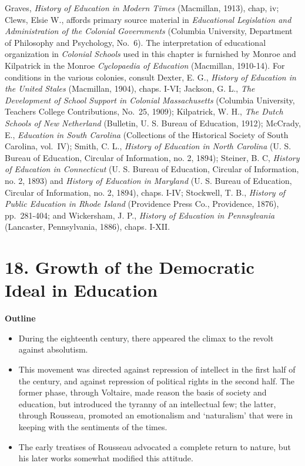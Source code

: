 \documentclass[
]{book}
\providecommand{\tightlist}{%
  \setlength{\itemsep}{0pt}\setlength{\parskip}{0pt}}
\begin{document}
Graves, \emph{History of Education in Modern Times} (Macmillan, 1913), chap, iv; Clews, Elsie W., affords primary source material in \emph{Educational Legislation and Administration of the Colonial Governments} (Columbia University, Department of Philosophy and Psychology, No.~6). The interpretation of educational organization in \emph{Colonial Schools} used in this chapter is furnished by Monroe and Kilpatrick in the Monroe \emph{Cyclopaedia of Education} (Macmillan, 1910-14). For conditions in the various colonies, consult Dexter, E. G., \emph{History of Education in the United Stales} (Macmillan, 1904), chaps. I-VI; Jackson, G. L., \emph{The Development of School Support in Colonial Massachusetts} (Columbia University, Teachers College Contributions, No.~25, 1909); Kilpatrick, W. H., \emph{The Dutch Schools of New Netherland} (Bulletin, U. S. Bureau of Education, 1912); McCrady, E., \emph{Education in South Carolina} (Collections of the Historical Society of South Carolina, vol.~IV); Smith,\protect\hypertarget{ch17.xmlux5cux23para.257.1.0.box.257.234.1051.404.q.50}{}{ C. L., \emph{History of Education in North Carolina} (U. S. Bureau of Education, Circular of Information, no. 2, 1894); Steiner, B. C, \emph{History of Education in Connecticut} (U. S. Bureau of Education, Circular of Information, no. 2, 1893) and \emph{History of Education in Maryland} (U. S. Bureau of Education, Circular of Information, no. 2, 1894), chaps. I-IV; Stockwell, T. B., \emph{History of Public Education in Rhode Island} (Providence Press Co., Providence, 1876), pp.~281-404; and Wickersham, J. P., \emph{History of Education in Pennsylvania} (Lancaster, Pennsylvania, 1886), chaps. I-XII.}

\hypertarget{growth-of-the-democratic-ideal-in-education}{%
\chapter{18. Growth of the Democratic Ideal in Education}\label{growth-of-the-democratic-ideal-in-education}}

\textbf{Outline}

\begin{itemize}
\tightlist
\item
  During the eighteenth century, there appeared the climax to the revolt against absolutism.
\item
  This movement was directed against repression of intellect in the first half of the century, and against repression of political rights in the second half. The former phase, through Voltaire, made reason the basis of society and education, but introduced the tyranny of an intellectual few; the latter, through Rousseau, promoted an emotionalism and `naturalism' that were in keeping with the sentiments of the times.
\item
  The early treatises of Rousseau advocated a complete return to nature, but his later works somewhat modified this attitude.
\end{itemize}
\end{document}
